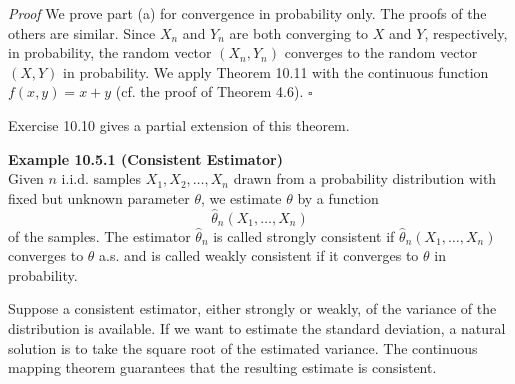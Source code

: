 \textit{Proof}
We prove part (a) for convergence in probability only. The proofs of the others are similar. Since $X_n$ and $Y_n$ are both converging to $X$ and $Y$, respectively, in probability, the random vector $(X_n,Y_n)$ converges to the random vector $(X,Y)$ in probability. We apply Theorem 10.11 with the continuous function $f(x,y)=x+y$ (cf. the proof of Theorem 4.6).
\hfill $\square$

Exercise 10.10 gives a partial extension of this theorem.

\textbf{Example 10.5.1 (Consistent Estimator)} \\
Given $n$ i.i.d. samples $X_1,X_2,\ldots,X_n$ drawn from a probability distribution with fixed but unknown parameter $\theta$, we estimate $\theta$ by a function
\[
\widehat{\theta}_n(X_1,\ldots,X_n)
\]
of the samples. The estimator $\widehat{\theta}_n$ is called strongly consistent if $\widehat{\theta}_n(X_1,\ldots,X_n)$ converges to $\theta$ a.s. and is called weakly consistent if it converges to $\theta$ in probability.

Suppose a consistent estimator, either strongly or weakly, of the variance of the distribution is available. If we want to estimate the standard deviation, a natural solution is to take the square root of the estimated variance. The continuous mapping theorem guarantees that the resulting estimate is consistent.
